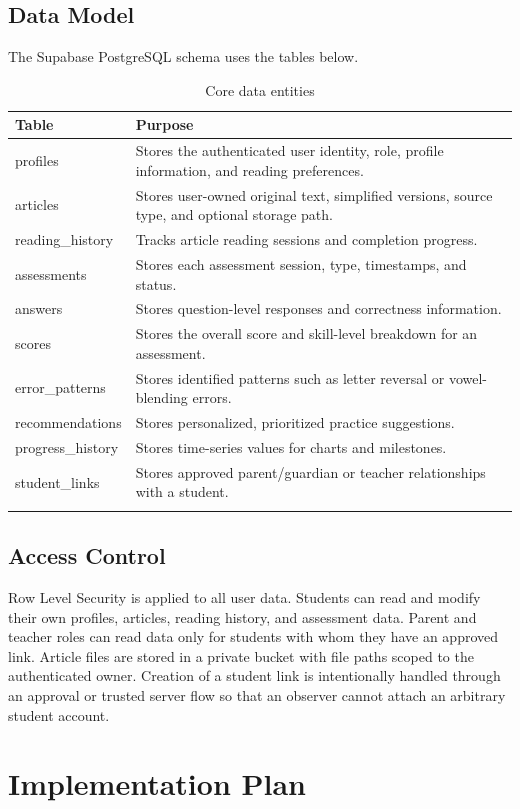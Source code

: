 \documentclass[a4paper]{tietreport}
\begin{document}
\section{Data Model}
The Supabase PostgreSQL schema uses the tables below.
\begin{longtable}{p{} p{}}
\toprule
\textbf{Table} & \textbf{Purpose} \\
\midrule
profiles & Stores the authenticated user identity, role, profile information, and reading preferences. \\
articles & Stores user-owned original text, simplified versions, source type, and optional storage path. \\
reading\_history & Tracks article reading sessions and completion progress. \\
assessments & Stores each assessment session, type, timestamps, and status. \\
answers & Stores question-level responses and correctness information. \\
scores & Stores the overall score and skill-level breakdown for an assessment. \\
error\_patterns & Stores identified patterns such as letter reversal or vowel-blending errors. \\
recommendations & Stores personalized, prioritized practice suggestions. \\
progress\_history & Stores time-series values for charts and milestones. \\
student\_links & Stores approved parent/guardian or teacher relationships with a student. \\
\bottomrule
\caption{Core data entities}
\end{longtable}

\section{Access Control}
Row Level Security is applied to all user data. Students can read and modify their own profiles, articles, reading history, and assessment data. Parent and teacher roles can read data only for students with whom they have an approved link. Article files are stored in a private bucket with file paths scoped to the authenticated owner. Creation of a student link is intentionally handled through an approval or trusted server flow so that an observer cannot attach an arbitrary student account.

\chapter{Implementation Plan}
\end{document}
